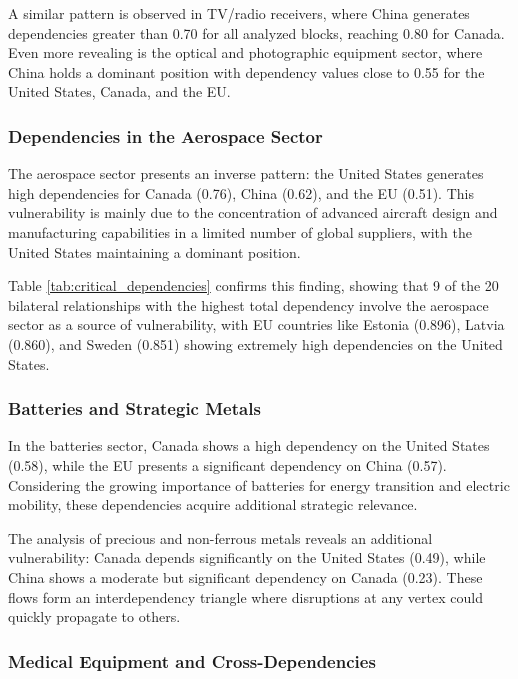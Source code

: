 \documentclass[final,1p,times,authoryear]{elsarticle}
\begin{document}
A similar pattern is observed in TV/radio receivers, where China generates dependencies greater than 0.70 for all analyzed blocks, reaching 0.80 for Canada. Even more revealing is the optical and photographic equipment sector, where China holds a dominant position with dependency values close to 0.55 for the United States, Canada, and the EU.

\subsubsection{Dependencies in the Aerospace Sector}

The aerospace sector presents an inverse pattern: the United States generates high dependencies for Canada (0.76), China (0.62), and the EU (0.51). This vulnerability is mainly due to the concentration of advanced aircraft design and manufacturing capabilities in a limited number of global suppliers, with the United States maintaining a dominant position.

Table \ref{tab:critical_dependencies} confirms this finding, showing that 9 of the 20 bilateral relationships with the highest total dependency involve the aerospace sector as a source of vulnerability, with EU countries like Estonia (0.896), Latvia (0.860), and Sweden (0.851) showing extremely high dependencies on the United States.

\subsubsection{Batteries and Strategic Metals}

In the batteries sector, Canada shows a high dependency on the United States (0.58), while the EU presents a significant dependency on China (0.57). Considering the growing importance of batteries for energy transition and electric mobility, these dependencies acquire additional strategic relevance.

The analysis of precious and non-ferrous metals reveals an additional vulnerability: Canada depends significantly on the United States (0.49), while China shows a moderate but significant dependency on Canada (0.23). These flows form an interdependency triangle where disruptions at any vertex could quickly propagate to others.

\subsubsection{Medical Equipment and Cross-Dependencies}
\end{document}
